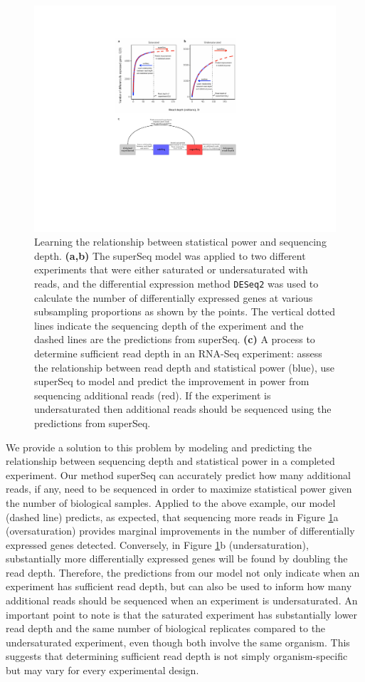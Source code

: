 \documentclass[11pt]{article}
\begin{document}
\begin{figure}[!htbp]
\includegraphics[width = .93\textwidth]{../analysis/figures/figure1_crop.pdf}
\centering
\caption{Learning the relationship between statistical power and sequencing depth. \textbf{(a,b)} The superSeq model was applied to two different experiments that were either saturated or undersaturated with reads, and the differential expression method {\tt DESeq2} was used to calculate the number of differentially expressed genes at various subsampling proportions as shown by the points. The vertical dotted lines indicate the sequencing depth of the experiment and the dashed lines are the predictions from superSeq. \textbf{(c)} A process to determine sufficient read depth in an RNA-Seq experiment: assess the relationship between read depth and statistical power (blue), use superSeq to model and predict the improvement in power from sequencing additional reads (red). If the experiment is undersaturated then additional reads should be sequenced using the predictions from superSeq.}
\label{fig:example}
\end{figure}

We provide a solution to this problem by modeling and predicting the relationship between sequencing depth and statistical power in a completed experiment. Our method superSeq can accurately predict how many additional reads, if any, need to be sequenced in order to maximize statistical power given the number of biological samples. Applied to the above example, our model (dashed line) predicts, as expected, that sequencing more reads in Figure \ref{fig:example}a (oversaturation) provides marginal improvements in the number of differentially expressed genes detected. Conversely, in Figure \ref{fig:example}b (undersaturation), substantially more differentially expressed genes will be found by doubling the read depth. Therefore, the predictions from our model not only indicate when an experiment has sufficient read depth, but can also be used to inform how many additional reads should be sequenced when an experiment is undersaturated. An important point to note is that the saturated experiment has substantially lower read depth and the same number of biological replicates compared to the undersaturated experiment, even though both involve the same organism. This suggests that determining sufficient read depth is not simply organism-specific but may vary for every experimental design.
\end{document}

